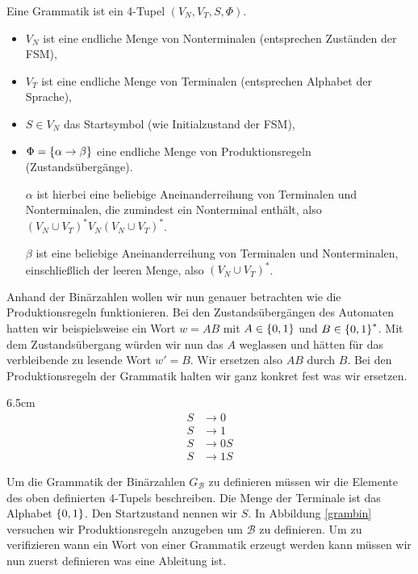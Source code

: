 \begin{defn}[Grammatik]
Eine Grammatik ist ein 4-Tupel $(V_N, V_T, S, \Phi)$.
\begin{itemize}
\item $V_N$ ist eine endliche Menge von Nonterminalen (entsprechen Zuständen der FSM),
\item $V_T$ ist eine endliche Menge von Terminalen (entsprechen Alphabet der Sprache),
\item $S \in V_N$ das Startsymbol (wie Initialzustand der FSM),
\item $\Phi=\left\{\alpha \to \beta\right\}$ eine endliche Menge von Produktionsregeln (Zustandsübergänge).

$\alpha$ ist hierbei eine beliebige Aneinanderreihung von Terminalen und Nonterminalen, die zumindest ein Nonterminal enthält,
also $(V_N \cup V_T)^* V_N (V_N \cup V_T)^*$.

$\beta$ ist eine beliebige Aneinanderreihung von Terminalen und Nonterminalen, einschließlich der leeren Menge,
also $(V_N \cup V_T)^*$.
\end{itemize}
\end{defn}

Anhand der Binärzahlen wollen wir nun genauer betrachten wie die Produktionsregeln funktionieren.
Bei den Zustandsübergängen des Automaten hatten wir beispielsweise ein Wort $w=AB$ mit $A \in \left\{0,1\right\}$ und $B \in \left\{0,1\right\}^*$.
Mit dem Zustandsübergang würden wir nun das $A$ weglassen und hätten für das verbleibende zu lesende Wort $w'=B$.
Wir ersetzen also $AB$ durch $B$. Bei den Produktionsregeln der Grammatik halten wir ganz konkret fest was wir ersetzen.

\begin{floatingfigure}[r]{6.5cm}
\begin{align*}
S &\to 0 \\
S &\to 1 \\
S &\to 0S \\
S &\to 1S
\end{align*}
 \caption{Binärzahlen Grammatik}
 \label{grambin}
\end{floatingfigure}

Um die Grammatik der Binärzahlen $G_{\mathcal{B}}$ zu definieren müssen wir die Elemente des oben definierten 4-Tupels beschreiben.
Die Menge der Terminale ist das Alphabet $\left\{0,1\right\}$.
Den Startzustand nennen wir $S$. In Abbildung \ref{grambin} versuchen wir Produktionsregeln anzugeben um $\mathcal{B}$ zu definieren.
Um zu verifizieren wann ein Wort von einer Grammatik erzeugt werden kann müssen wir nun zuerst definieren was eine Ableitung ist.

